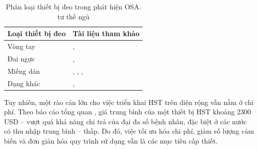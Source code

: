 \begin{table}[htbp]
  \centering
  \caption{Phân loại thiết bị đeo trong phát hiện OSA. tư thế ngủ}
  \label{tab:wearable_types}
  \begin{tabular}{|p{5.5cm}|p{7.5cm}|}
    \hline
    \textbf{Loại thiết bị đeo} & \textbf{Tài liệu tham khảo}                                                                                                          \\
    \hline
    Vòng tay                   & \cite{jeon2020realtime}, \cite{shen2022mtcnn} \cite{e3hst} \cite{osa_sanchez2025}                                                    \\
    \hline
    Đai ngực                   & \cite{svmHSt2017}, \cite{chen2024hdc} \cite{e3hst} \cite{osa_sanchez2025}                                                            \\
    \hline
    Miếng dán                  & \cite{Vu2025SleepPosition}, \cite{yeo2022resnet}, \cite{yeo2022respiratory}, \cite{p_3} \cite{osa_sanchez2025}                       \\
    \hline
    Dạng khác                  & \cite{Sleep_Posture_Detection}, \cite{hst_wear_paper} \cite{osa_sanchez2025} \cite{hstSurvey} \cite{hst_paper} \cite{hst_wear_paper} \\
    \hline
  \end{tabular}
\end{table}

Tuy nhiên, một rào cản lớn cho việc triển khai HST trên diện rộng vẫn nằm ở chi
phí. Theo báo cáo tổng quan \cite{hst_review}, giá trung bình của một thiết bị
HST khoảng 2300 USD – vượt quá khả năng chi trả của đại đa số bệnh nhân, đặc
biệt ở các nước có thu nhập trung bình – thấp. Do đó, việc tối ưu hóa chi phí,
giảm số lượng cảm biến và đơn giản hóa quy trình sử dụng vẫn là các mục tiêu
cấp thiết.

